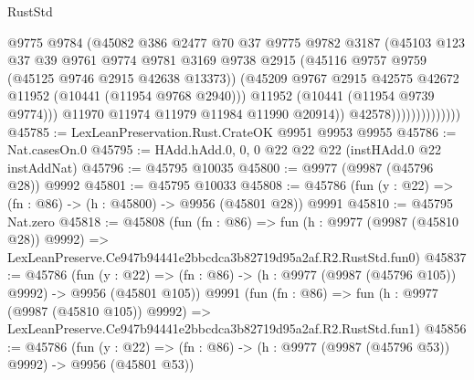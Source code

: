 \begin{lexlean}{RustStd}
\begin{coremodule}
                                  @9775
                                  @9784
                                  (@45082
                                    @386
                                    @2477
                                    @70
                                    @37
                                    @9775
                                    @9782
                                    @3187
                                    (@45103
                                      @123
                                      @37
                                      @39
                                      @9761
                                      @9774
                                      @9781
                                      @3169
                                      @9738
                                      @2915
                                      (@45116 @9757 @9759 (@45125 @9746 @2915 @42638 @13373))
                                      (@45209
                                        @9767
                                        @2915
                                        @42575
                                        @42672
                                        @11952
                                        (@10441 (@11954 @9768 @2940)))
                                      @11952
                                      (@10441 (@11954 @9739 @9774)))
                                    @11970
                                    @11974
                                    @11979
                                    @11984
                                    @11990
                                    @20914))
                                @42578))))))))))))))
@45785 := LexLeanPreservation.Rust.CrateOK @9951 @9953 @9955
@45786 := Nat.casesOn.{0}
@45795 := HAdd.hAdd.{0, 0, 0} @22 @22 @22 (instHAdd.{0} @22 instAddNat)
@45796 := @45795 @10035
@45800 := @9977 (@9987 (@45796 @28)) @9992
@45801 := @45795 @10033
@45808 := @45786 (fun (y : @22) => (fn : @86) -> (h : @45800) -> @9956 (@45801 @28)) @9991
@45810 := @45795 Nat.zero
@45818 := @45808
    (fun (fn : @86) =>
    fun (h : @9977 (@9987 (@45810 @28)) @9992) =>
    LexLeanPreserve.Ce947b94441e2bbcdca3b82719d95a2af.R2.RustStd.fun0)
@45837 := @45786
    (fun (y : @22) => (fn : @86) -> (h : @9977 (@9987 (@45796 @105)) @9992) -> @9956 (@45801 @105))
    @9991
    (fun (fn : @86) =>
    fun (h : @9977 (@9987 (@45810 @105)) @9992) =>
    LexLeanPreserve.Ce947b94441e2bbcdca3b82719d95a2af.R2.RustStd.fun1)
@45856 := @45786
    (fun (y : @22) => (fn : @86) -> (h : @9977 (@9987 (@45796 @53)) @9992) -> @9956 (@45801 @53))

\end{coremodule}
\end{lexlean}
